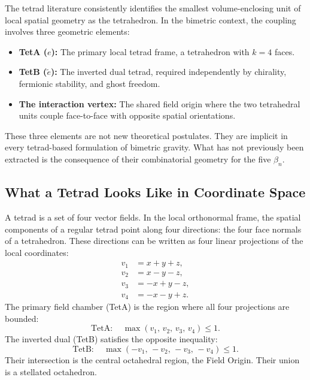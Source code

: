 \documentclass[twocolumn]{iopjournal}
\begin{document}
The tetrad literature consistently identifies the smallest volume-enclosing unit of local spatial geometry as the tetrahedron. In the bimetric context, the coupling involves three geometric elements:

\begin{itemize}
\item \textbf{TetA ($e$):} The primary local tetrad frame, a tetrahedron with $k = 4$ faces.
\item \textbf{TetB ($\tilde{e}$):} The inverted dual tetrad, required independently by chirality, fermionic stability, and ghost freedom.
\item \textbf{The interaction vertex:} The shared field origin where the two tetrahedral units couple face-to-face with opposite spatial orientations.
\end{itemize}

These three elements are not new theoretical postulates. They are implicit in every tetrad-based formulation of bimetric gravity. What has not previously been extracted is the consequence of their combinatorial geometry for the five $\beta_n$.

\subsection*{What a Tetrad Looks Like in Coordinate Space}

A tetrad is a set of four vector fields. In the local orthonormal frame, the spatial components of a regular tetrad point along four directions: the four face normals of a tetrahedron. These directions can be written as four linear projections of the local coordinates:
\begin{align}
v_1 &= x + y + z, \nonumber \\
v_2 &= x - y - z, \nonumber \\
v_3 &= -x + y - z, \nonumber \\
v_4 &= -x - y + z.
\end{align}
The primary field chamber (TetA) is the region where all four projections are bounded:
\begin{equation}
\text{TetA}: \quad \max(v_1,\, v_2,\, v_3,\, v_4) \leq 1.
\end{equation}
The inverted dual (TetB) satisfies the opposite inequality:
\begin{equation}
\text{TetB}: \quad \max(-v_1,\, -v_2,\, -v_3,\, -v_4) \leq 1.
\end{equation}
Their intersection is the central octahedral region, the Field Origin. Their union is a stellated octahedron.
\end{document}
